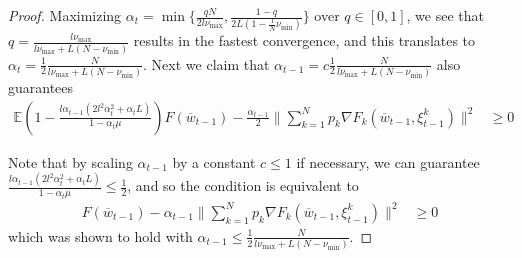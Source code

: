 \begin{proof}
	Maximizing $\alpha_{t}=\min\{\frac{qN}{2l\nu_{\max}},\frac{1-q}{2L(1-\frac{1}{N}\nu_{\min})}\}$
	over $q\in[0,1]$, we see that $q=\frac{l\nu_{\max}}{l\nu_{\max}+L(N-\nu_{\min})}$
	results in the fastest convergence, and this translates to $\alpha_{t}=\frac{1}{2}\frac{N}{l\nu_{\max}+L(N-\nu_{\min})}$.
	Next we claim that $\alpha_{t-1}=c\frac{1}{2}\frac{N}{l\nu_{\max}+L(N-\nu_{\min})}$
	also guarantees
	\begin{align*}
	\mathbb{E}(1-\frac{l\alpha_{t-1}(2l^{2}\alpha_{t}^{2}+\alpha_{t}L)}{1-\alpha_{t}\mu})F(\overline{w}_{t-1})-\frac{\alpha_{t-1}}{2}\|\sum_{k=1}^{N}p_{k}\nabla F_{k}(\overline{w}_{t-1},\xi_{t-1}^{k})\|^{2} & \geq0
	\end{align*}
	
	Note that by scaling $\alpha_{t-1}$ by a constant $c\leq1$ if necessary,
	we can guarantee $\frac{l\alpha_{t-1}(2l^{2}\alpha_{t}^{2}+\alpha_{t}L)}{1-\alpha_{t}\mu}\leq\frac{1}{2}$,
	and so the condition is equivalent to 
	\begin{align*}
	F(\overline{w}_{t-1})-\alpha_{t-1}\|\sum_{k=1}^{N}p_{k}\nabla F_{k}(\overline{w}_{t-1},\xi_{t-1}^{k})\|^{2} & \geq0
	\end{align*}
	which was shown to hold with $\alpha_{t-1}\leq\frac{1}{2}\frac{N}{l\nu_{\max}+L(N-\nu_{\min})}$. 
	

\end{proof}
